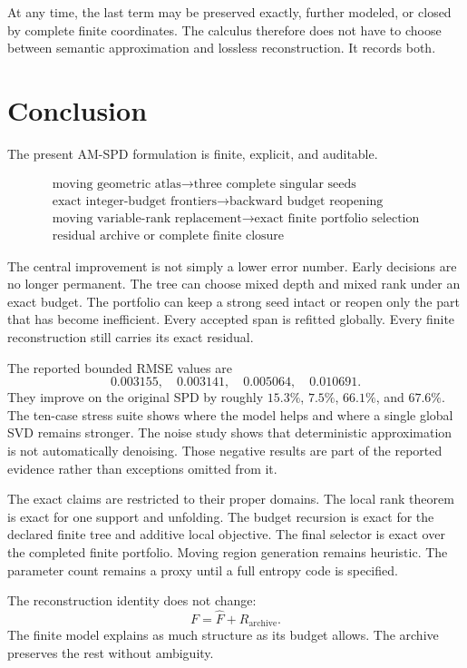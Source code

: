 \documentclass[11pt]{article}
\theoremstyle{definition}
\theoremstyle{remark}
\begin{document}
At any time, the last term may be preserved exactly, further modeled, or closed by complete finite coordinates. The calculus therefore does not have to choose between semantic approximation and lossless reconstruction. It records both.

\FloatBarrier
\FloatBarrier
\section{Conclusion}
The present AM-SPD formulation is finite, explicit, and auditable.

\[
\boxed{
\begin{gathered}
\text{moving geometric atlas}\longrightarrow\text{three complete singular seeds}\\
\text{exact integer-budget frontiers}\longrightarrow\text{backward budget reopening}\\
\text{moving variable-rank replacement}\longrightarrow\text{exact finite portfolio selection}\\
\text{residual archive or complete finite closure}
\end{gathered}
}
\]

The central improvement is not simply a lower error number. Early decisions are no longer permanent. The tree can choose mixed depth and mixed rank under an exact budget. The portfolio can keep a strong seed intact or reopen only the part that has become inefficient. Every accepted span is refitted globally. Every finite reconstruction still carries its exact residual.

The reported bounded RMSE values are
\[
0.003155,\quad0.003141,\quad0.005064,\quad0.010691.
\]
They improve on the original SPD by roughly $15.3\%$, $7.5\%$, $66.1\%$, and $67.6\%$. The ten-case stress suite shows where the model helps and where a single global SVD remains stronger. The noise study shows that deterministic approximation is not automatically denoising. Those negative results are part of the reported evidence rather than exceptions omitted from it.

The exact claims are restricted to their proper domains. The local rank theorem is exact for one support and unfolding. The budget recursion is exact for the declared finite tree and additive local objective. The final selector is exact over the completed finite portfolio. Moving region generation remains heuristic. The parameter count remains a proxy until a full entropy code is specified.

The reconstruction identity does not change:
\[
\boxed{F=\widehat F+R_{\mathrm{archive}}.}
\]
The finite model explains as much structure as its budget allows. The archive preserves the rest without ambiguity.
\end{document}
